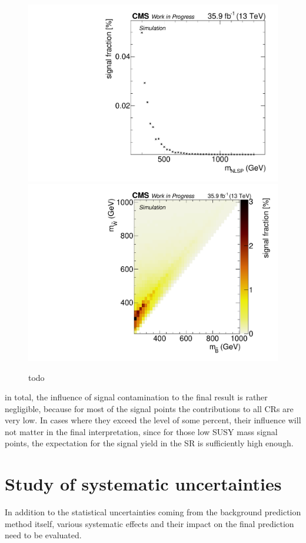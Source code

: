 \begin{figure}
 \includegraphics[width=\pairwidth]{figures/contamination/tching_DY}
 \includegraphics[width=\pairwidth]{figures/contamination/gmsb_WZ}
 \caption{todo}
 \label{fig:signalCont}
\end{figure}
in total, the influence of signal contamination to the final result is rather negligible, because for most of the signal points the contributions to all CRs are very low. In cases where they exceed the level of some percent, their influence will not matter in the final interpretation, since for those low SUSY mass signal points, the expectation for the signal yield in the SR is sufficiently high enough.


\section{Study of systematic uncertainties}\label{sec:Syst}
In addition to the statistical uncertainties coming from the background prediction method itself, various systematic effects and their impact on the final prediction need to be evaluated.

